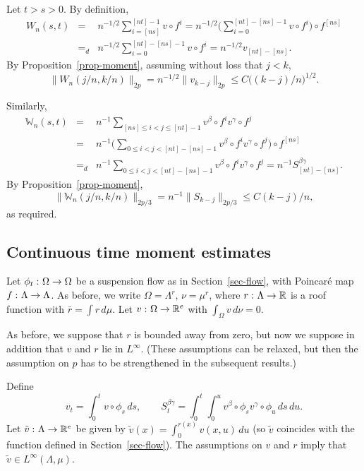 \documentclass[aop,MSNbibl,seceqn,dvips]{arximspdf}
\newcommand{\R}{\mathbb{R}}
\newcommand{\BBW}{\mathbb{W}}
\newcommand{\tildev}{\tilde{v}}
\begin{document}
\begin{pf}
Let $t>s>0$. By definition,
%
\begin{eqnarray*}
W_n(s,t) & =&n^{-1/2}\sum_{i=[ns]}^{[nt]-1}v
\circ f^i =n^{-1/2} \Biggl(\sum_{i=0}^{[nt]-[ns]-1}v
\circ f^i \Biggr)\circ f^{[ns]}
\\
& =_d& n^{-1/2}\sum_{i=0}^{[nt]-[ns]-1}v
\circ f^i= n^{-1/2}v_{[nt]-[ns]}.
\end{eqnarray*}
%
By Proposition~\ref{prop-moment}, assuming without loss that $j<k$,
%
\[
\bigl\|W_n(j/n,k/n)\bigr\|_{2p}=n^{-1/2}\|v_{k-j}
\|_{2p}\le C\bigl((k-j)/n\bigr)^{1/2}.
\]

Similarly,
%
\begin{eqnarray*}
\BBW_n(s,t) & =& n^{-1} \sum_{[ns]\le i<j\le[nt]-1}
v^\beta\circ f^i v^\gamma\circ f^j\\
&=&n^{-1} \biggl(\sum_{0\le i<j<[nt]-[ns]-1}
v^\beta \circ f^i v^\gamma\circ f^j
\biggr)\circ f^{[ns]}
\\
& =_d&n^{-1} \sum_{0\le i<j<[nt]-[ns]-1}
v^\beta\circ f^i v^\gamma\circ
f^j=n^{-1}S^{\beta\gamma
}_{[nt]-[ns]}.
\end{eqnarray*}
%
By Proposition~\ref{prop-moment},
%
\[
\bigl\|\BBW_n(j/n,k/n)\bigr\|_{2p/3}= n^{-1}
\|S_{k-j}\|_{2p/3}\le C(k-j)/n,
\]
%
as required.
\end{pf}

\subsection{Continuous time moment estimates}

Let $\phi_t\dvtx\Omega\to\Omega$ be a suspension flow as in
Section~\ref{sec-flow},
with Poincar\'e map $f\dvtx\Lambda\to\Lambda$. As before, we write
$\Omega=\Lambda^r$, $\nu=\mu^r$, where $r\dvtx\Lambda\to\R$ is
a roof
function with
$\bar r=\int r \,d\mu$.
Let $v\dvtx\Omega\to\R^e$ with $\int_\Omega v \,d\nu=0$.

As before, we suppose that $r$ is bounded away from zero, but now
we suppose in addition that $v$ and $r$ lie in $L^\infty$.
(These assumptions can be relaxed, but then the assumption on $p$ has
to be strengthened in the subsequent results.)

Define
%
\[
v_t=\int_0^t v\circ
\phi_s \,ds, \qquad S_t^{\beta\gamma}= \int_0^t
\int_0^u v^\beta\circ
\phi_s v^\gamma \circ \phi_u \,ds \,du.
\]
%
Let $\tildev\dvtx\Lambda\to\R^e$ be given by $\tildev(x)=\int_0^{r(x)}v(x,u) \,du$
(so $\tildev$ coincides with the function defined in Section~\ref{sec-flow}).
The assumptions on $v$ and $r$ imply that $\tildev\in L^\infty
(\Lambda
,\mu)$.
\end{document}
